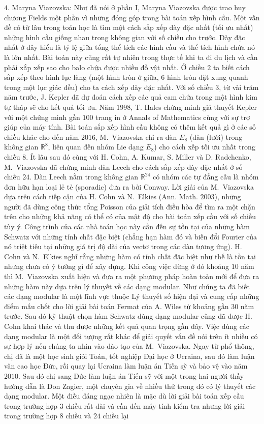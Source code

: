 \begin{multicols}{2}
	\vskip 0.05cm
	$4.$ Maryna Viazovska: Như đã nói ở phần I, Maryna Viazovska được trao huy chương Fields một phần vì những đóng góp trong bài toán xếp hình cầu.
	\vskip 0.05cm
	Một vấn đề có từ lâu trong toán học là tìm một cách sắp xếp dày đặc nhất (tối ưu nhất) những hình cầu giống nhau trong không gian với số chiều cho trước. Dày đặc nhất ở đây hiểu là tỷ lệ giữa tổng thể tích các hình cầu và thể tích hình chứa nó là lớn nhất. Bài toán này cũng rất tự nhiên trong thực tế khi ta đi du lịch và cần phải xắp xếp sao cho balo chứa được nhiều đồ vật nhất. Ở chiều $2$ ta biết cách sắp xếp theo hình lục lăng (một hình tròn ở giữa, $6$ hình tròn đặt xung quanh trong một lục giác đều) cho ta cách xếp dày đặc nhất. Với số chiều $3$, từ vài trăm năm trước, J. Kepler đã dự đoán cách xếp các quả cam chứa trong một hình kim tự tháp sẽ cho kết quả tối ưu. Năm $1998$, T. Hales chứng minh giả thuyết Kepler với một chứng minh gần $100$ trang in ở Annals of Mathematics cùng với sự trợ giúp của máy tính. Bài toán sắp xếp hình cầu không có thêm kết quả gì ở các số chiều khác cho đến năm $2016$, M.~Viazovska chỉ ra dàn $E_{8}$ (dàn (lưới) trong không gian $\mathbb{R}^8$, liên quan đến nhóm Lie dạng $E_{8}$) cho cách xếp tối ưu nhất trong chiều $8$. Ít lâu sau đó cùng với H. Cohn, A. Kumar, S. Miller và D. Radchenko, M.~Viazovska đã chứng minh dàn Leech cho cách sắp xếp dày đặc nhất ở số chiều $24$. Dàn Leech nằm trong không gian $\mathbb{R}^{24}$ có nhóm các tự đẳng cấu là nhóm đơn hữu hạn loại lẻ tẻ (sporadic) đưa ra bởi Conway. Lời giải của M.~Viazovska dựa trên cách tiếp cận của H. Cohn và N.~Elkies (Ann. Math. $2003$), những người đã dùng công thức tổng Poisson của giải tích điều hòa để tìm ra một chặn trên cho những khả năng có thể có của mật độ cho bài toán xếp cầu với số chiều tùy ý. Công trình của các nhà toán học này cần đến sự tồn tại của những hàm Schwatz với những tính chất đặc biệt (chẳng hạn hàm đó và biến đổi Fourier của nó triệt tiêu tại những giá trị độ dài của vectơ trong các dàn tương ứng). H. Cohn và N.~Elkies nghĩ rằng những hàm có tính chất đặc biệt như thế là tồn tại nhưng chưa có ý tưởng gì để xây dựng. Khi công việc dừng ở đó khoảng $10$ năm thì M.~Viazovska xuất hiện và đưa ra một phương pháp hoàn toàn mới để đưa ra những hàm này dựa trên lý thuyết về các dạng modular. Như chúng ta đã biết các dạng modular là một lĩnh vực thuộc Lý thuyết số hiện đại và cung cấp những điểm mấu chốt cho lời giải bài toán Fermat của A. Wiles từ khoảng gần $30$ năm trước. Sau đó kỹ thuật chọn hàm Schwatz dùng dạng modular cũng đã được H. Cohn khai thác và thu được những kết quả quan trọng gần đây. Việc dùng các dạng modular là một đối tượng rất khác để giải quyết vấn đề nói trên ít nhiều có sự hợp lý nếu chúng ta nhìn vào đào tạo của M.~Viazovska. Ngay từ phổ thông, chị đã là một học sinh giỏi Toán, tốt nghiệp Đại học ở Ucraina, sau đó làm luận văn cao học Đức, rồi quay lại Ucraina làm luận án Tiến sỹ và bảo vệ vào năm $2010$. Sau đó chị sang Đức làm luận án Tiến sỹ với một trong hai người thầy hướng dẫn là Don Zagier, một chuyên gia về nhiều thứ trong đó có lý thuyết các dạng modular. Một điều đáng ngạc nhiên là mặc dù lời giải bài toán xếp cầu trong trường hợp $3$ chiều rất dài và cần đến máy tính kiểm tra nhưng lời giải trong trường hợp $8$ chiều và $24$ chiều lại 
\end{multicols}
